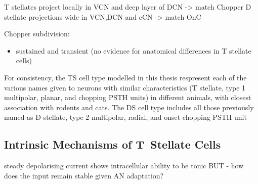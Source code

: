 T stellates project locally in VCN and deep layer of DCN -> match Chopper \citep{RhodeOertelEtAl:1983,SmithRhode:1989}
D stellate projections wide in VCN,DCN and cCN -> match OnC  \citep{SmithRhode:1989}



Chopper subdivision:
\begin{itemize}
\item sustained and transient (no evidence for anatomical differences in T stellate cells)
\end{itemize}




  For consistency, the TS cell type modelled in this thesis respresent each of the
  various names given to neurons with similar characteristics (T stellate, type 1
  multipolar, planar, and chopping PSTH units) in different animals, with closest
  association with rodents and cats. The DS cell type includes all those previously named as D stellate, type 2
  multipolar, radial, and onset chopping PSTH unit



 \subsection{Intrinsic Mechanisms of T~Stellate Cells}\label{sec:intr-mech-tstellate} %



steady depolarising current shows intracellular ability to be tonic
\cite{Oertel:1983,OertelWuEtAl:1988} BUT - how does the input remain stable
given AN adaptation?


